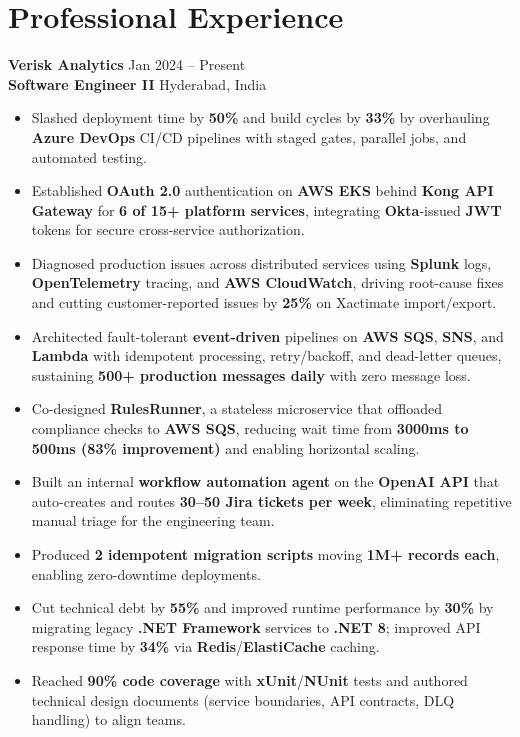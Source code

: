\documentclass[a4paper,10pt]{article}
\begin{document}
\section*{Professional Experience}

\textbf{Verisk Analytics} \hfill Jan 2024 -- Present \\
\textbf{Software Engineer II} \hfill Hyderabad, India

\begin{itemize}[leftmargin=*]
    \item Slashed deployment time by \textbf{50\%} and build cycles by \textbf{33\%} by overhauling \textbf{Azure DevOps} CI/CD pipelines with staged gates, parallel jobs, and automated testing.
    \item Established \textbf{OAuth 2.0} authentication on \textbf{AWS EKS} behind \textbf{Kong API Gateway} for \textbf{6 of 15+ platform services}, integrating \textbf{Okta}-issued \textbf{JWT} tokens for secure cross-service authorization.
    \item Diagnosed production issues across distributed services using \textbf{Splunk} logs, \textbf{OpenTelemetry} tracing, and \textbf{AWS CloudWatch}, driving root-cause fixes and cutting customer-reported issues by \textbf{25\%} on Xactimate import/export.
    \item Architected fault-tolerant \textbf{event-driven} pipelines on \textbf{AWS SQS}, \textbf{SNS}, and \textbf{Lambda} with idempotent processing, retry/backoff, and dead-letter queues, sustaining \textbf{500+ production messages daily} with zero message loss.
    \item Co-designed \textbf{RulesRunner}, a stateless microservice that offloaded compliance checks to \textbf{AWS SQS}, reducing wait time from \textbf{3000ms to 500ms (83\% improvement)} and enabling horizontal scaling.
    \item Built an internal \textbf{workflow automation agent} on the \textbf{OpenAI API} that auto-creates and routes \textbf{30--50 Jira tickets per week}, eliminating repetitive manual triage for the engineering team.
    \item Produced \textbf{2 idempotent migration scripts} moving \textbf{1M+ records each}, enabling zero-downtime deployments.
    \item Cut technical debt by \textbf{55\%} and improved runtime performance by \textbf{30\%} by migrating legacy \textbf{.NET Framework} services to \textbf{.NET 8}; improved API response time by \textbf{34\%} via \textbf{Redis}/\textbf{ElastiCache} caching.
    \item Reached \textbf{90\% code coverage} with \textbf{xUnit}/\textbf{NUnit} tests and authored technical design documents (service boundaries, API contracts, DLQ handling) to align teams.
\end{itemize}
\end{document}
